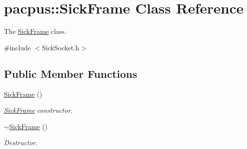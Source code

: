\hypertarget{classpacpus_1_1SickFrame}{\section{pacpus\-:\-:Sick\-Frame Class Reference}
\label{classpacpus_1_1SickFrame}
}


The \hyperlink{classpacpus_1_1SickFrame}{Sick\-Frame} class.  




{\ttfamily \#include $<$Sick\-Socket.\-h$>$}

\subsection*{Public Member Functions}
\begin{DoxyCompactItemize}
\item 
\hypertarget{classpacpus_1_1SickFrame_ac579d615e5d5a5655cf77db24e05a4e2}{\hyperlink{classpacpus_1_1SickFrame_ac579d615e5d5a5655cf77db24e05a4e2}{Sick\-Frame} ()}\label{classpacpus_1_1SickFrame_ac579d615e5d5a5655cf77db24e05a4e2}

\begin{DoxyCompactList}\small\item\em \hyperlink{classpacpus_1_1SickFrame}{Sick\-Frame} constructor. \end{DoxyCompactList}\item 
\hypertarget{classpacpus_1_1SickFrame_a1836cf6f51350adccf73116096cd5a7a}{\hyperlink{classpacpus_1_1SickFrame_a1836cf6f51350adccf73116096cd5a7a}{$\sim$\-Sick\-Frame} ()}\label{classpacpus_1_1SickFrame_a1836cf6f51350adccf73116096cd5a7a}

\begin{DoxyCompactList}\small\item\em Destructor. \end{DoxyCompactList}\end{DoxyCompactItemize}
